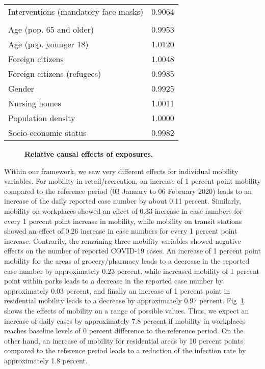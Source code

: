 \documentclass[10pt,letterpaper]{article}
\begin{document}
\begin{table}[!ht]
\begin{tabular}[t]{lr}
\hspace{1em}Interventions (mandatory face masks) & 0.9064\\
\addlinespace[0.3em]
\multicolumn{2}{l}{\textbf{Demographic}}\\
\hspace{1em}Age (pop. 65 and older) & 0.9953\\
\hspace{1em}Age (pop. younger 18) & 1.0120\\
\hspace{1em}Foreign citizens & 1.0048\\
\hspace{1em}Foreign citizens (refugees) & 0.9985\\
\hspace{1em}Gender & 0.9925\\
\hspace{1em}Nursing homes & 1.0011\\
\hspace{1em}Population density & 1.0000\\
\hspace{1em}Socio-economic status & 0.9982\\
\bottomrule
\end{tabular}
\label{tab:causaleffects}
\end{table}

\begin{figure}[!h]
\caption{{\bf Relative causal effects of exposures.}}
\label{fig:effectsrange}
\end{figure}

Within our framework, we saw very different effects for individual mobility variables. For mobility in retail/recreation, an increase of 1 percent point mobility compared to the reference period (03 January to 06 February 2020) leads to an increase of the daily reported case number by about 0.11 percent. Similarly, mobility on workplaces showed an effect of 0.33 increase in case numbers for every 1 percent point increase in mobility, while mobility on transit stations showed an effect of 0.26 increase in case numbers for every 1 percent point increase. Contrarily, the remaining three mobility variables showed negative effects on the number of reported COVID-19 cases. An increase of 1 percent point mobility for the areas of grocery/pharmacy leads to a decrease in the reported case number by approximately 0.23 percent, while increased mobility of 1 percent point within parks leads to a decrease in the reported case number by approximately 0.03 percent, and finally an increase of 1 percent point in residential mobility leads to a decrease by approximately 0.97 percent. Fig~\ref{fig:effectsrange} shows the effects of mobility on a range of possible values. Thus, we expect an increase of daily cases by approximately 7.8 percent if mobility in workplaces reaches baseline levels of 0 percent difference to the reference period. On the other hand, an increase of mobility for residential areas by 10 percent points compared to the reference period leads to a reduction of the infection rate by approximately 1.8 percent.
\end{document}
